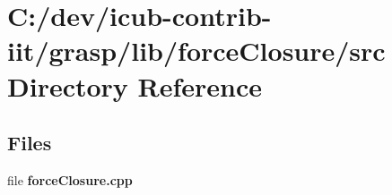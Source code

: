 \section{C\+:/dev/icub-\/contrib-\/iit/grasp/lib/force\+Closure/src Directory Reference}
\label{dir_7ec6ad8298c4de138f67cf24a0dea868}
\subsection*{Files}
\begin{DoxyCompactItemize}
\item 
file {\bfseries force\+Closure.\+cpp}
\end{DoxyCompactItemize}
